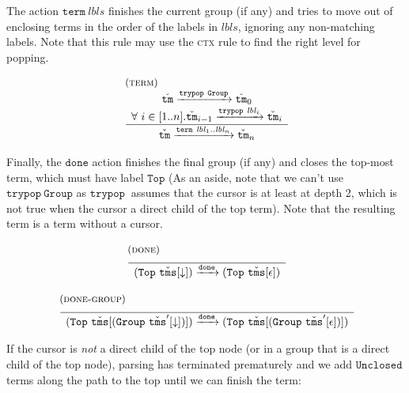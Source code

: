 \documentclass{article}
\newcommand{\rulename}{\textsc}
\newcommand{\rn}{\rulename}
\newcommand{\irule}[3]{\begin{array}{l}{~\small\mbox{(\rulename{#1})}}\\\;\frac{\begin{array}{c}#2\end{array}}{\begin{array}{l}#3\end{array}}\end{array}}
\newcommand{\labelFont}{\texttt}
\newcommand{\lbl}{\ensuremath{\mathit{lbl}}}
\newcommand{\lbls}{\ensuremath{\mathit{lbls}}}
\newcommand{\Top}{\ensuremath{\labelFont{Top}}}
\newcommand{\Group}{\ensuremath{\labelFont{Group}}}
\newcommand{\Unclosed}{\ensuremath{\labelFont{Unclosed}}}
\newcommand{\tm}{\ensuremath{\mathtt{tm}}}
\newcommand{\tms}{\ensuremath{\mathtt{tms}}}
\newcommand{\Tm}{\ensuremath{\check{\tm}}}
\newcommand{\Tms}{\ensuremath{\check{\tms}}}
\newcommand{\trypop}[1]{\ensuremath{\texttt{trypop}~#1}}
\newcommand{\term}[1]{\ensuremath{\texttt{term}~#1}}
\newcommand{\done}{\ensuremath{\texttt{done}}}
\newcommand{\cursor}{\ensuremath{\downarrow}}
\newcommand{\steps}[1]{\ensuremath{\xrightarrow{#1}}}
\begin{document}
The action \term{\lbls} finishes the current group (if any) and
tries to move out of enclosing terms in the order of the labels in
\lbls, ignoring any non-matching labels. Note that this rule may
use the \rn{ctx} rule to find the right level for popping.

\[
  \begin{array}{c}
    \irule{term}{
    \Tm \steps{\trypop{\Group}} \Tm_0\\
    \forall~i\in[1..n]. \Tm_{i-1} \steps{\trypop{\lbl_i}} \Tm_i
    }{
    \Tm \steps{\term{\lbl_1..\lbl_n}} \Tm_n
    }
  \end{array}
\]

Finally, the \done{} action finishes the final group (if any) and
closes the top-most term, which must have label \Top{} (As an aside,
note that we can't use \trypop{\Group} as \trypop{} assumes that
the cursor is at least at depth 2, which is not true when the
cursor a direct child of the top term). Note that the resulting
term is a term without a cursor.

\[
  \begin{array}{c}
    \irule{done}{}{
    (\Top~\Tms[\cursor]) \steps{\done} (\Top~\Tms[\epsilon])
    }
    \\\\
    \irule{done-group}{}{
    (\Top~\Tms[(\Group~\Tms'[\cursor])]) \steps{\done} (\Top~\Tms[(\Group~\Tms'[\epsilon])])
    }
  \end{array}
\]

If the cursor is \emph{not} a direct child of the top node (or in
a group that is a direct child of the top node), parsing has
terminated prematurely and we add \Unclosed{} terms along the path
to the top until we can finish the term:
\end{document}
